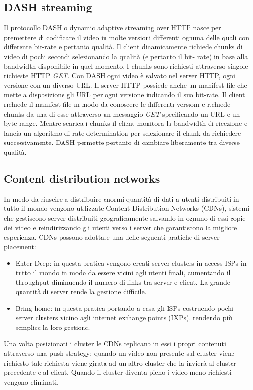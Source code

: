 \subsection{DASH streaming}
Il protocollo DASH o dynamic adaptive streaming over HTTP nasce per premettere di codificare il video in molte versioni differenti ognuna delle quali con 
differente bit-rate e pertanto qualit\`a. Il client dinamicamente richiede chunks di video di pochi secondi selezionando la qualit\`a (e pertanto il bit-
rate) in base alla bandwidth disponibile in quel momento. I chunks sono richiesti attraverso singole richieste HTTP \emph{GET}. Con DASH ogni video \`e 
salvato nel server HTTP, ogni versione con un diverso URL. Il server HTTP possiede anche un manifest file che mette a disposizione gli URL per ogni versione
indicando il suo bit-rate. Il client richiede il manifest file in modo da conoscere le differenti versioni e richiede chunks da una di esse attraverso un
messaggio \emph{GET} specificando un URL e un byte range. Mentre scarica i chunks il client monitora la bandwidth di ricezione e lancia un algoritmo di rate 
determination per selezionare il chunk da richiedere successivamente. DASH permette pertanto di cambiare liberamente tra diverse qualit\`a. 
\subsection{Content distribution networks}
In modo da riuscire a distribuire enormi quantit\`a di dati a utenti distribuiti in tutto il mondo vengono utilizzate Content Distribution Networks (CDNs),
sistemi che gestiscono server distribuiti geograficamente salvando in ognuno di essi copie dei video e reindirizzando gli utenti verso i server che 
garantiscono la migliore esperienza. CDNs possono adottare una delle seguenti pratiche di server placement:
\begin{itemize}
\item Enter Deep: in questa pratica vengono creati server clusters in access ISPs in tutto il mondo in modo da essere vicini agli utenti finali, aumentando
il throughput diminuendo il numero di links tra server e client. La grande quantit\`a di server rende la gestione difficile. 
\item Bring home: in questa pratica portando a casa gli ISPs costruendo pochi server clusters vicino agli internet exchange points (IXPs), rendendo pi\`u 
semplice la loro gestione.
\end{itemize}
Una volta posizionati i cluster le CDNs replicano in essi i propri contenuti attraverso una push strategy: quando un video non presente sul cluster viene
richiesto tale richiesta viene girata ad un altro cluster che la invier\`a al cluster precedente e al client. Quando il cluster diventa pieno i 
video meno richiesti vengono eliminati. 
